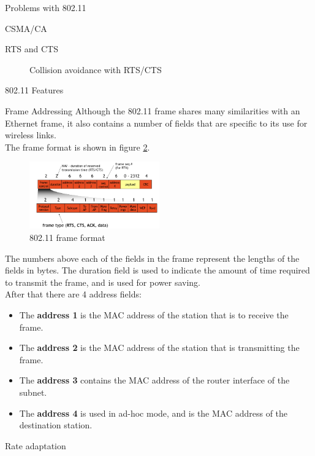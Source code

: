 \begin{section}{Problems with 802.11}
\begin{subsection}{CSMA/CA}
\begin{subsubsection}{RTS and CTS}
\begin{figure}[h]
        \caption{Collision avoidance with RTS/CTS}
        \label{fig:rts-cts}
      \end{figure}

    \end{subsubsection}

  \end{subsection}
\end{section}
\begin{section}{802.11 Features}
  \begin{subsection}{Frame Addressing}
    Although the 802.11 frame shares many similarities with an Ethernet frame, it also contains a 
    number of fields that are specific to its use for wireless links.\\
    The frame format is shown in figure \ref{fig:80211 frame format}.
    \begin{figure}[h]
      \centering
      \includegraphics[width=0.5\textwidth]{img/wireless/802.11 frame.png.png}
      \caption{802.11 frame format}
      \label{fig:80211 frame format}
    \end{figure}
  \end{subsection}
  The numbers above each of the fields in the frame represent the lengths of the fields in bytes.
  The duration field is used to indicate the amount of time required to transmit the frame, and is 
  used for power saving.\\
  After that there are 4 address fields:
  \begin{itemize}
    \item The \textbf{address 1} is the MAC address of the station that is to receive the frame.
    \item The \textbf{address 2} is the MAC address of the station that is transmitting 
      the frame.
    \item The \textbf{address 3} contains the MAC address of the router interface of the subnet.
    \item The \textbf{address 4} is used in ad-hoc mode, and is the MAC address of the 
      destination station.
  \end{itemize}
  \begin{subsection}{Rate adaptation}

\end{subsection}
\end{section}
